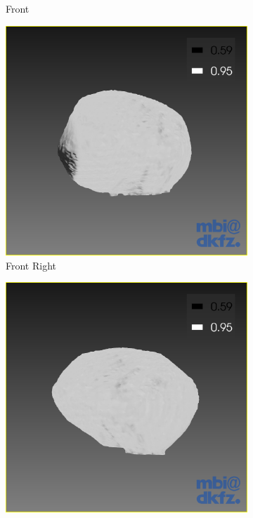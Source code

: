 \begin{figure}[h]
\begin{subfigure}[b]{0.20\textwidth}
    \caption*{Front}
    \label{fig:surface_front}
  \end{subfigure}%
  \begin{subfigure}[b]{0.20\textwidth}
    \includegraphics[width=\textwidth]{images/surface/surface_180_4.png}
    \caption*{Front Right}
    \label{fig:surface_front_right}
  \end{subfigure}%
  \begin{subfigure}[b]{0.20\textwidth}
    \includegraphics[width=\textwidth]{images/surface/surface_180_5.png}

\end{subfigure}
\end{figure}
